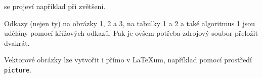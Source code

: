 \documentclass[11pt]{article}
\theoremstyle{plain}
\theoremstyle{plain}
\begin{document}
se projeví například při zvětšení.

Odkazy (nejen ty) na obrázky 1, 2 a 3, na tabulky 1 a 2 a také algoritmus 1 jsou udělány pomocí křížových odkazů. Pak je ovšem potřeba zdrojový soubor přeložit dvakrát.

Vektorové obrázky lze vytvořit i přímo v \LaTeX um, například pomocí prostředí \verb|picture|.
\end{document}
